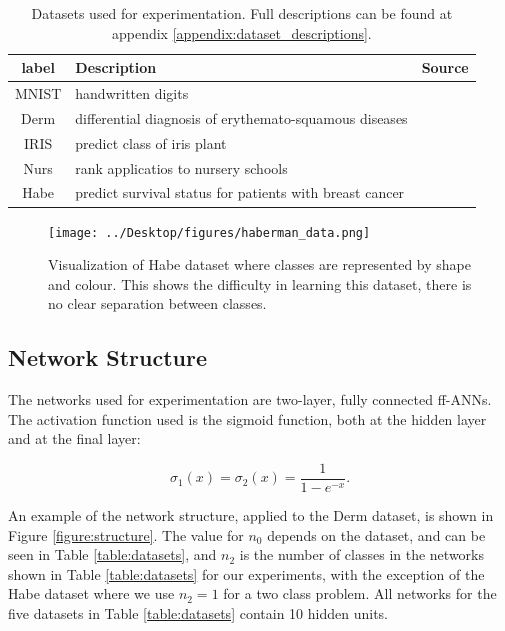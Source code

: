 \documentclass[letterpaper,12pt,titlepage,oneside,final]{book}
\begin{document}
	\begin{table}[h]
		\begin{center}
			\begin{tabular}{ |c|l|c| }  
				\hline
				\textbf{label} & \textbf{Description} & \textbf{Source}\\
				\hline
				MNIST & handwritten digits & \cite{mnist}\\
				\hline
				Derm & differential diagnosis of erythemato-squamous diseases & \cite{Derm}\\
				\hline
				IRIS & predict class of iris plant & \cite{IRIS}\\
				\hline
				Nurs & rank applicatios to nursery schools & \cite{Nurs}\\
				\hline
				Habe & predict survival status for patients with breast cancer  & \cite{Habe}\\ 
				\hline
			\end{tabular}
		\end{center}
		\caption{Datasets used for experimentation. Full descriptions can be found at appendix \ref{appendix:dataset_descriptions}.}
		\label{table:datasettopics}
	\end{table}
	
	\begin{figure}[h]
		\centering
		\texttt{[image: ../Desktop/figures/haberman\_data.png]}
		\caption{Visualization of Habe dataset where classes are represented by shape and colour. This shows the difficulty in learning this dataset, there is no clear separation between classes.}
		\label{figure:haberman}
	\end{figure}
	
	
	\subsection{Network Structure}
	
	The networks used for experimentation are two-layer, fully connected ff-ANNs. The activation function used is the sigmoid function, both at the hidden layer and at the final layer:
	
	\begin{equation}
	\sigma_{1}(x) = \sigma_{2}(x) = \frac{1}{1 - e^{-x}}.
	\end{equation}
	
	An example of the network structure, applied to the Derm dataset, is shown in Figure \ref{figure:structure}. The value for $n_{0}$ depends on the dataset, and can be seen in Table \ref{table:datasets}, and $n_{2}$ is the number of classes in the networks shown in Table
	\ref{table:datasets} for our experiments, with the exception of the Habe dataset where we use $n_{2} = 1$ for a two class problem. All networks for the five datasets in Table \ref{table:datasets} contain 10 hidden units. 
	
\end{document}
